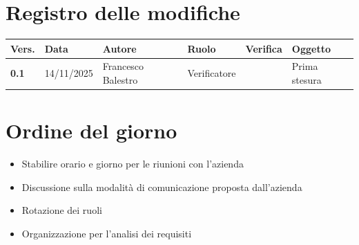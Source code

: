 \documentclass[a4paper,12pt]{article}
\begin{document}
    

    \newpage
    \section*{Registro delle modifiche}

    \begin{table}[h!]
        \begin{tabularx}{\textwidth}{|l|l|l|l|X|X|}
            \hline
            \textbf{Vers.} & \textbf{Data} & \textbf{Autore} & \textbf{Ruolo} & \textbf{Verifica} & \textbf{Oggetto} \\
            \hline
            \textbf{0.1} & 14/11/2025 & Francesco Balestro & Verificatore &  & Prima stesura \\
        \hline
        \end{tabularx}
    \end{table}

    \newpage
    \tableofcontents
    \newpage

    \section{Ordine del giorno} {
        \begin{itemize}
            \item Stabilire orario e giorno per le riunioni con l'azienda
            \item Discussione sulla modalità di comunicazione proposta dall'azienda
            \item Rotazione dei ruoli
            \item Organizzazione per l'analisi dei requisiti
        \end{itemize}
    }
\end{document}
